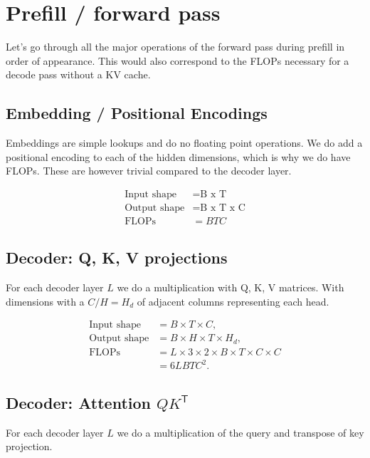 \documentclass{article}
\begin{document}
\section{Prefill / forward pass}

Let's go through all the major operations of the forward pass during prefill in order of appearance. This would also correspond to the FLOPs necessary for a decode pass without a KV cache.

\subsection{Embedding / Positional Encodings}

Embeddings are simple lookups and do no floating point operations. We do add a positional encoding to each of the hidden dimensions, which is why we do have FLOPs. These are however trivial compared to the decoder layer.

\begin{align}
	\text{Input shape}  &= \boxed{\text{B x T}} \\
	\text{Output shape} &= \boxed{\text{B x T x C}} \\
	\text{FLOPs}        &= \boxed{BTC}
\end{align}


\subsection{Decoder: Q, K, V projections}

For each decoder layer $L$ we do a multiplication with Q, K, V matrices. With dimensions  with a $C / H = H_d$ of adjacent columns representing each head.

\begin{align}
\text{Input shape}  &= \boxed{B \times T \times C}, \\
\text{Output shape} &= \boxed{B \times H \times T \times H_d}, \\
\text{FLOPs}
   &= L \times 3 \times 2 \times B \times T \times C \times C \\
   &= \boxed{6L BTC^2}.
\end{align}

\subsection{Decoder: Attention $QK^{\mathsf{T}}$}

For each decoder layer $L$ we do a multiplication of the query and transpose of key projection.
\end{document}
